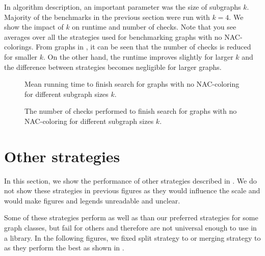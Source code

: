 In \Subgraphs{} algorithm description, an important parameter was the size of subgraphs \( k \).
Majority of the benchmarks in the previous section were run with \( k = 4 \).
%
We show the impact of	\( k \) on runtime and number of checks.
Note that you see averages over all the strategies used for benchmarking
graphs with no NAC-colorings.
%
From graphs in ,
it can be seen that the number of checks is reduced for smaller \( k \).
On the other hand, the runtime improves slightly for larger \( k \)
and the difference between strategies becomes negligible for larger graphs.

\begin{figure}[thbp]
	\centering
	\scalebox{\BenchFigureScale}{}
	\caption[Mean runtime for graphs with no NAC-coloring]{
		Mean running time to finish search for graphs with no NAC-coloring for different subgraph sizes \( k \).}%
	\label{fig:graph_no_nac_coloring_first_runtime_subgraph_size}
\end{figure}%
\begin{figure}[thbp]
	\centering
	\scalebox{\BenchFigureScale}{}
	\caption[Checks performed for graphs with no NAC-coloring]{
		The number of checks performed to finish search for graphs with no NAC-coloring for different subgraph sizes \( k \).}%
	\label{fig:graph_no_nac_coloring_first_checks_subgraph_size}
\end{figure}%


\section{Other strategies}%
\label{sec:other_strategies}

In this section, we show the performance of other strategies described in .
We do not show these strategies in previous figures as they would influence
the scale and would make figures and legends unreadable and unclear.

Some of these strategies perform as well as
than our preferred strategies for some graph classes,
but fail for others and therefore are not universal enough to use in a library.
%
In the following figures, we fixed
split strategy to \Neighbors{} or merging strategy to \MergeLinear{}
as they perform the best as shown in .

